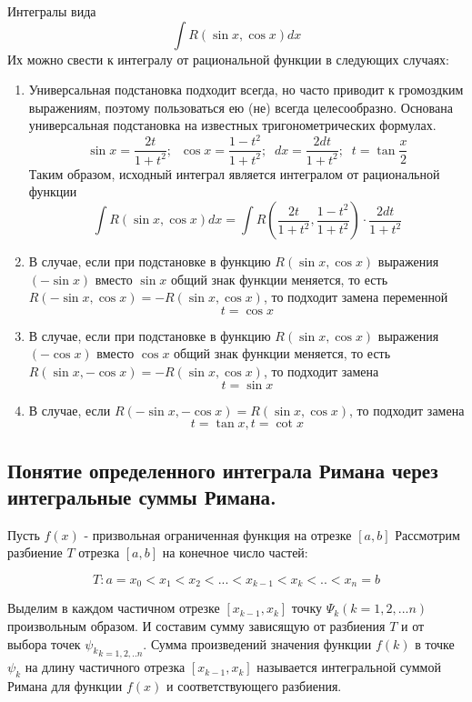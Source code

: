 \documentclass[a4paper,12pt]{article}
\theoremstyle{plain} %
\theoremstyle{definition} %
\theoremstyle{remark} %
\begin{document}
Интегралы вида
\[ \int R (\sin x, \cos x)dx \]
Их можно свести к интегралу от рациональной функции в следующих случаях:

\begin{enumerate}
	\item Универсальная подстановка подходит всегда, но часто приводит к громоздким выражениям, поэтому пользоваться ею (не) всегда целесообразно. Основана универсальная подстановка на известных тригонометрических формулах.
	      \[ \sin x = \frac{2t}{1 + t^2}; \; \; \cos x = \frac{1 - t^2}{1 + t^2}; \; \; dx = \frac{2dt}{1 + t^2}; \; \; t = \tan \frac{x}{2} \]
	      Таким образом, исходный интеграл является интегралом от рациональной функции
	      \[ \int R(\sin x, \cos x)dx = \int R \left( \frac{2t}{1 + t^2}, \frac{1 - t^2}{1 + t^2} \right) \cdot \frac{2dt}{1 + t^2} \]
	\item В случае, если при подстановке в функцию $R(\sin x, \cos x)$ выражения $(-\sin x)$ вместо $\sin x$ общий знак функции меняется, то есть $R(- \sin x, \cos x) = - R(\sin x, \cos x)$, то подходит замена переменной \[t = \cos x\]
	\item В случае, если при подстановке в функцию $R(\sin x, \cos x)$ выражения $(-\cos x)$ вместо $\cos x$ общий знак функции меняется, то есть $R(\sin x, - \cos x) = -R (\sin x, \cos x)$, то подходит замена \[ t= \sin x \]
	\item В случае, если $R(- \sin x, - \cos x) = R(\sin x, \cos x)$, то подходит замена \[ t = \tan x, t = \cot x \]
\end{enumerate}


\newpage
\subsection*{Понятие определенного интеграла Римана через интегральные суммы Римана.                      }

Пусть $f(x)$ - призвольная ограниченная функция на отрезке $[a, b]$
Рассмотрим разбиение $T$ отрезка $[a, b]$ на конечное число частей:

\[
	T: a = x_0 < x_1 < x_2 < ... < x_{k - 1} < x_{k} < .. < x_n = b
\]

Выделим в каждом частичном отрезке $[x_{k-1}, x_k]$ точку $\Psi_k (k = 1, 2, ... n)$ произвольным образом.
И составим сумму зависящую от разбиения $T$ и от выбора точек ${\psi_k}_{k = 1, 2, .. n}$.
Сумма произведений значения функции $f(k)$ в точке $\psi_k$ на длину частичного отрезка $[x_{k-1}, x_k]$ называется интегральной суммой Римана для функции $f(x)$ и соответствующего разбиения.
\end{document}
